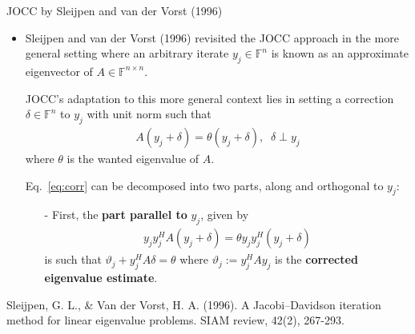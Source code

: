 \documentclass[t,usepdftitle=false]{beamer}
\begin{document}
\begin{frame}{JOCC by Sleijpen and van der Vorst (1996)}
\begin{itemize}
\item Sleijpen and van der Vorst (1996) revisited the JOCC approach in the more general setting where an arbitrary iterate $y_j\in\mathbb{F}^n$ is known as an approximate eigenvector of $A\in\mathbb{F}^{n\times n}$.
\item[] JOCC's adaptation to this more general context lies in setting a correction $\delta\in\mathbb{F}^n$ to $y_j$ with unit norm such that
\begin{align}\label{eq:corr}
A(y_j+\delta)=\theta(y_j+\delta),\;\;
\delta\perp y_j
\end{align} 
where $\theta$ is the wanted eigenvalue of $A$.
\item[] Eq.~\eqref{eq:corr} can be decomposed into two parts, along and orthogonal to $y_j$:
\begin{itemize}\normalsize
\item[-] First, the \textbf{part parallel to} $y_j$, given by
\begin{align*}
y_jy_j^HA(y_j+\delta)=\theta y_jy_j^H(y_j+\delta)
\end{align*}
is such that $\boxed{\vartheta_j+y_j^HA\delta=\theta}$ where $\boxed{\vartheta_j:=y_j^HAy_j}$ is the \textbf{corrected eigenvalue estimate}.
\end{itemize}
\end{itemize}\smallskip
\tiny{Sleijpen, G. L., \& Van der Vorst, H. A. (1996). A Jacobi--Davidson iteration method for linear eigenvalue problems. SIAM review, 42(2), 267-293.}
\end{frame}
\end{document}
